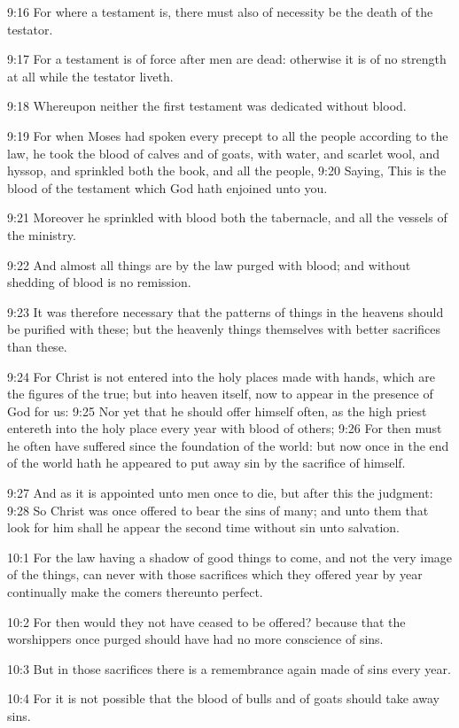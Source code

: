 9:16 For where a testament is, there must also of necessity be the death of the testator.

9:17 For a testament is of force after men are dead: otherwise it is of no strength at all while the testator liveth.

9:18 Whereupon neither the first testament was dedicated without blood.

9:19 For when Moses had spoken every precept to all the people according to the law, he took the blood of calves and of goats, with water, and scarlet wool, and hyssop, and sprinkled both the book, and all the people, 9:20 Saying, This is the blood of the testament which God hath enjoined unto you.

9:21 Moreover he sprinkled with blood both the tabernacle, and all the vessels of the ministry.

9:22 And almost all things are by the law purged with blood; and without shedding of blood is no remission.

9:23 It was therefore necessary that the patterns of things in the heavens should be purified with these; but the heavenly things themselves with better sacrifices than these.

9:24 For Christ is not entered into the holy places made with hands, which are the figures of the true; but into heaven itself, now to appear in the presence of God for us: 9:25 Nor yet that he should offer himself often, as the high priest entereth into the holy place every year with blood of others; 9:26 For then must he often have suffered since the foundation of the world: but now once in the end of the world hath he appeared to put away sin by the sacrifice of himself.

9:27 And as it is appointed unto men once to die, but after this the judgment: 9:28 So Christ was once offered to bear the sins of many; and unto them that look for him shall he appear the second time without sin unto salvation.

10:1 For the law having a shadow of good things to come, and not the very image of the things, can never with those sacrifices which they offered year by year continually make the comers thereunto perfect.

10:2 For then would they not have ceased to be offered? because that the worshippers once purged should have had no more conscience of sins.

10:3 But in those sacrifices there is a remembrance again made of sins every year.

10:4 For it is not possible that the blood of bulls and of goats should take away sins.

